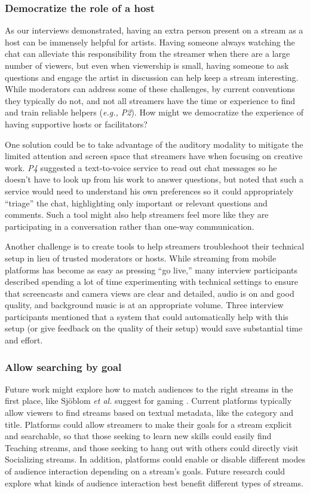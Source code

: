\subsubsection{Democratize the role of a host}
As our interviews demonstrated, having an extra person present on a stream as a host can be immensely helpful for artists. Having someone always watching the chat can alleviate this responsibility from the streamer when there are a large number of viewers, but even when viewership is small, having someone to ask questions and engage the artist in discussion can help keep a stream interesting. While moderators can address some of these challenges, by current conventions they typically do not, and not all streamers have the time or experience to find and train reliable helpers (\textit{e.g., P2}). How might we democratize the experience of having supportive hosts or facilitators?

One solution could be to take advantage of the auditory modality to mitigate the limited attention and screen space that streamers have when focusing on creative work. \textit{P4} suggested a text-to-voice service to read out chat messages so he doesn't have to look up from his work to answer questions, but noted that such a service would need to understand his own preferences so it could appropriately ``triage'' the chat, highlighting only important or relevant questions and comments. Such a tool might also help streamers feel more like they are participating in a conversation rather than one-way communication.

Another challenge is to create tools to help streamers troubleshoot their technical setup in lieu of trusted moderators or hosts. While streaming from mobile platforms has become as easy as pressing ``go live,'' many interview participants described spending a lot of time experimenting with technical settings to ensure that screencasts and camera views are clear and detailed, audio is on and good quality, and background music is at an appropriate volume. Three interview participants mentioned that a system that could automatically help with this setup (or give feedback on the quality of their setup) would save substantial time and effort. 

\subsubsection{Allow searching by goal}
Future work might explore how to match audiences to the right streams in the first place, like Sj{\"{o}}blom \emph{et al.} suggest for gaming \cite{Sjoblom2017a}. Current platforms typically allow viewers to find streams based on textual metadata, like the category and title. Platforms could allow streamers to make their goals for a stream explicit and searchable, so that those seeking to learn new skills could easily find Teaching streams, and those seeking to hang out with others could directly visit Socializing streams. In addition, platforms could enable or disable different modes of audience interaction depending on a stream's goals. Future research could explore what kinds of audience interaction best benefit different types of streams.

